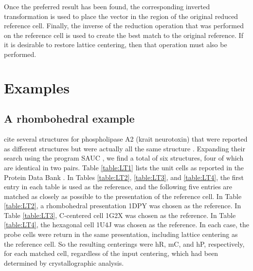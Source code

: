 \documentclass[preprint]{iucr}              %
\numberwithin{equation}{section}
\numberwithin{equation}{section}
\begin{document}
	Once the preferred result has been found, the corresponding inverted transformation is used
	to place the vector in the region of the original reduced reference cell. Finally, the inverse of the reduction
	operation that was performed on the reference cell is used to create the best match
	to the original reference. If it is desirable to restore lattice centering, then that operation must also  be
	performed.
	
	\section{Examples}
	\subsection{A rhombohedral example}
	 cite several structures for phospholipase A2 (krait neurotoxin) that were reported as 
	different structures but were actually all the same structure \cite{bernstein2020}. Expanding their search using the program SAUC 
	\cite{mcgill2014},
	we find a total of six structures, four of which are identical in 
	two pairs. Table \ref{table:LT1} lists the unit cells as reported in the Protein
	Data Bank \cite{Bernstein1977} \cite{Berman2000}. In Tables \ref{table:LT2}, \ref{table:LT3}, and \ref{table:LT4}, the first
	entry in each table is used as the reference, and the following five entries are matched as 
	closely as possible to the presentation of the reference cell. In Table \ref{table:LT2}, a
	rhombohedral presentation 1DPY was chosen as the reference. In Table \ref{table:LT3},
	C-centered cell 1G2X was chosen as the reference. In Table \ref{table:LT4}, the hexagonal cell 1U4J
	was chosen as the reference. In each case, the probe cells
	were return in the same presentation, including lattice 
	centering as the reference cell. So the resulting centerings
	were hR, mC, and hP, respectively, for each matched cell,
	regardless of the input centering, which had been determined
	by crystallographic analysis.
	~~\\
	
\end{document}
